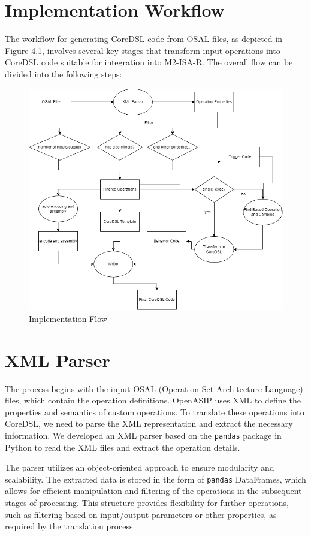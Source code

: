 \section{Implementation Workflow}

The workflow for generating CoreDSL code from OSAL files, as depicted in Figure 4.1, involves several key stages that transform input operations into CoreDSL code suitable for integration into M2-ISA-R. The overall flow can be divided into the following steps:

\begin{figure}[h]
  \centering
  \includegraphics[width=\linewidth]{figures/flow.png}
  \caption{Implementation Flow}
\end{figure}

\section{XML Parser}

The process begins with the input OSAL (Operation Set Architecture Language) files, which contain the operation definitions. OpenASIP uses XML to define the properties and semantics of custom operations. To translate these operations into CoreDSL, we need to parse the XML representation and extract the necessary information. We developed an XML parser based on the \texttt{pandas} package in Python to read the XML files and extract the operation details.

The parser utilizes an object-oriented approach to ensure modularity and scalability. The extracted data is stored in the form of \texttt{pandas} DataFrames, which allows for efficient manipulation and filtering of the operations in the subsequent stages of processing. This structure provides flexibility for further operations, such as filtering based on input/output parameters or other properties, as required by the translation process.

